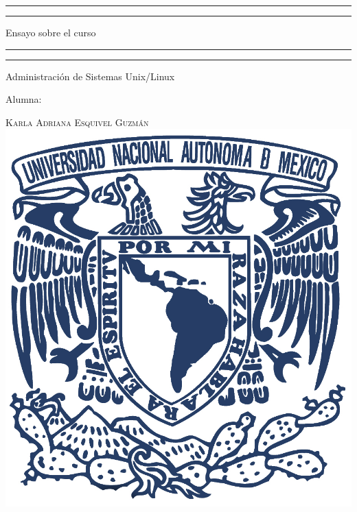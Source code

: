 \documentclass[a4paper, 11pt, oneside]{article}
\begin{document}
 

\begin{titlepage} 

	\centering 
	
	\scshape 
	
	\vspace*{\baselineskip} 
	
	
	
	\rule{\textwidth}{1.6pt}\vspace*{-\baselineskip}\vspace*{2pt} 
	\rule{\textwidth}{0.4pt} 
	
	\vspace{0.75\baselineskip} 
	
	{\LARGE Ensayo sobre el curso}	
	\vspace{0.75\baselineskip} 
	
	\rule{\textwidth}{0.4pt}\vspace*{-\baselineskip}\vspace{3.2pt}
	\rule{\textwidth}{1.6pt} 
	
	\vspace{2\baselineskip} 
	

	Administración de Sistemas Unix/Linux
	
	\vspace*{3\baselineskip} 
	
	
	
	Alumna:
	
	\vspace{0.5\baselineskip} 
	
	{\scshape\Large Karla Adriana Esquivel Guzmán \\} 
	\vspace{0.5\baselineskip} 
	\vfill
	\includegraphics{unam.jpg}
	

\end{titlepage}
\end{document}
